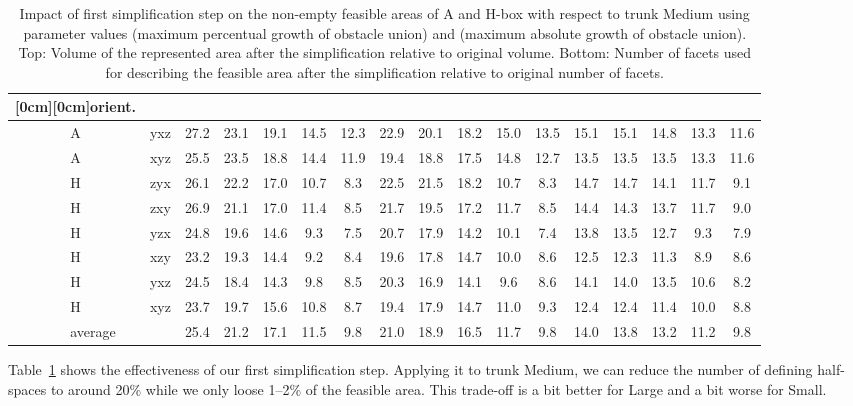 \documentclass{article}
\newcommand{\TSmall}{{\sc Small}}
\newcommand{\TMedium}{{\sc Medium}}
\newcommand{\TLarge}{{\sc Large}}
\begin{document}
\begin{table}[t]
\begin{tabular}{|cc|ccccc|ccccc|ccccc|}
\raisebox{1.4ex}[0cm][0cm]{orient.} & 
 &  &  &  &  &  &  &  &  & 
&  &  &  &  &  \\
\hline
A & yxz & 27.2 & 23.1 & 19.1 & 14.5 & 12.3 & 22.9 & 20.1 & 18.2 & 15.0 & 13.5 & 15.1 & 15.1 & 14.8 & 13.3 & 11.6 \\
A & xyz & 25.5 & 23.5 & 18.8 & 14.4 & 11.9 & 19.4 & 18.8 & 17.5 & 14.8 & 12.7 & 13.5 & 13.5 & 13.5 & 13.3 & 11.6 \\
H & zyx & 26.1 & 22.2 & 17.0 & 10.7 & 8.3 & 22.5 & 21.5 & 18.2 & 10.7 & 8.3 & 14.7 & 14.7 & 14.1 & 11.7 & 9.1 \\
H & zxy & 26.9 & 21.1 & 17.0 & 11.4 & 8.5 & 21.7 & 19.5 & 17.2 & 11.7 & 8.5 & 14.4 & 14.3 & 13.7 & 11.7 & 9.0 \\
H & yzx & 24.8 & 19.6 & 14.6 & 9.3 & 7.5 & 20.7 & 17.9 & 14.2 & 10.1 & 7.4 & 13.8 & 13.5 & 12.7 & 9.3 & 7.9 \\
H & xzy & 23.2 & 19.3 & 14.4 & 9.2 & 8.4 & 19.6 & 17.8 & 14.7 & 10.0 & 8.6 & 12.5 & 12.3 & 11.3 & 8.9 & 8.6 \\
H & yxz & 24.5 & 18.4 & 14.3 & 9.8 & 8.5 & 20.3 & 16.9 & 14.1 & 9.6 & 8.6 & 14.1 & 14.0 & 13.5 & 10.6 & 8.2 \\
H & xyz & 23.7 & 19.7 & 15.6 & 10.8 & 8.7 & 19.4 & 17.9 & 14.7 & 11.0 & 9.3 & 12.4 & 12.4 & 11.4 & 10.0 & 8.8 \\
\hline
\multicolumn{2}{|c|}{average} 
& 25.4 & 21.2 & 17.1 & 11.5 &  9.8
& 21.0 & 18.9 & 16.5 & 11.7 &  9.8
& 14.0 & 13.8 & 13.2 & 11.2 &  9.8 \\
\hline
\end{tabular}

\caption{Impact of first simplification step on the non-empty feasible
  areas of A and H-box with respect to trunk {\TMedium} using
  parameter values  (maximum percentual
  growth of obstacle union) and 
  (maximum absolute growth of obstacle union). Top: Volume of the
  represented area after the simplification relative to original
  volume.  Bottom: Number of facets used for describing the feasible
  area after the simplification relative to original number of
  facets.}

\label{table:simplificationDetailed}
\end{table}

Table~\ref{table:simplificationDetailed} shows the effectiveness of
our first simplification step. Applying it to trunk {\TMedium}, we can
reduce the number of defining half-spaces to around 20\% while we only
loose 1--2\% of the feasible area. This trade-off is a bit better for
{\TLarge} and a bit worse for {\TSmall}.
\end{document}
